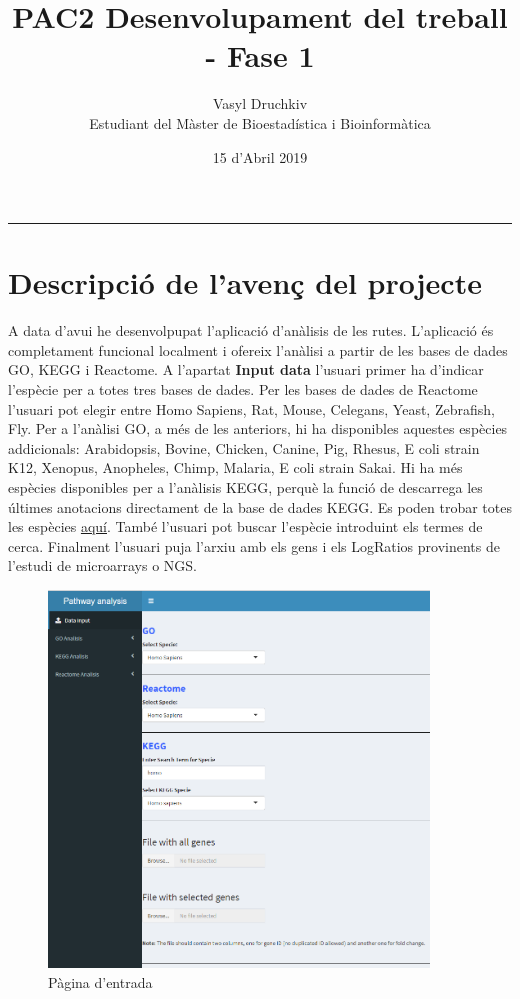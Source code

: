 \documentclass[]{article}
\title{PAC2 Desenvolupament del treball - Fase 1}
\date{15 d'Abril 2019}
\author{Vasyl Druchkiv \\ Estudiant del Màster de Bioestadística i Bioinformàtica}
\begin{document}
\maketitle
\makeatletter

\makeatother
\begin{spacing}{0.1}
\tableofcontents
\end{spacing}

\begin{center}
\noindent\rule{8cm}{0.4pt}
\end{center}

\section{Descripció de l'avenç del projecte} 

A data d'avui he desenvolpupat l'aplicació d'anàlisis de les rutes. L'aplicació és completament funcional localment i ofereix l'anàlisi a partir de les bases de dades GO, KEGG i Reactome. A l'apartat \textbf{Input data} l'usuari primer ha d'indicar l'espècie per a totes tres bases de dades. Per les bases de dades de Reactome l'usuari pot elegir entre Homo Sapiens, Rat, Mouse, Celegans, Yeast, Zebrafish, Fly. Per a l’anàlisi GO, a més de les anteriors, hi ha disponibles aquestes espècies addicionals: Arabidopsis, Bovine, Chicken, Canine, Pig, Rhesus, E coli strain K12, Xenopus, Anopheles, Chimp, Malaria, E coli strain Sakai. Hi ha més espècies disponibles per a l'anàlisis KEGG, perquè la funció de   descarrega les últimes anotacions directament de la base de dades KEGG. Es poden trobar totes les espècies \href{http://www.genome.jp/kegg/catalog/org_list.html}{aquí}. També l'usuari pot buscar l'espècie introduint els termes de cerca. Finalment l'usuari puja l'arxiu amb els gens i els LogRatios provinents de l'estudi de microarrays o NGS. 


\begin{figure}[H]
\caption{Pàgina d'entrada}
\centering
\includegraphics[width=0.9\textwidth]{App_F1}
\end{figure}
\end{document}
